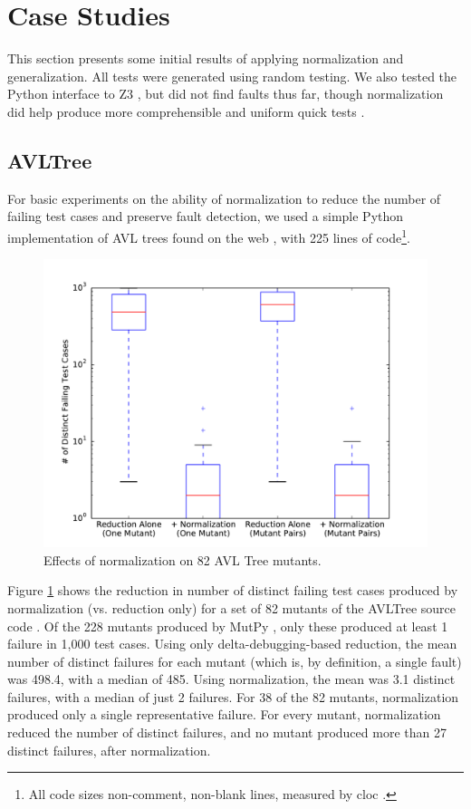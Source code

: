 \section {Case Studies}

This section presents some initial results of applying normalization
and generalization.   All tests were generated using
random testing.  We also tested the Python interface to Z3 \cite{z3},
but did not find faults thus far, though normalization did help produce more
comprehensible and uniform
quick tests \cite{icst2014}.

\subsection{AVLTree}

For basic experiments on the ability of normalization to reduce the
number of failing test cases and preserve fault detection, we used a
simple Python implementation of AVL trees found on the web
\cite{avltree}, with 225 lines of code\footnote{All code sizes non-comment, non-blank lines, measured by cloc \cite{cloc}.}.

\begin{figure}
\includegraphics[width=\columnwidth]{length}
\caption{Effects of normalization on 82 AVL Tree mutants.}
\label{normeffect}
\end{figure}

Figure \ref{normeffect} shows the reduction in number of distinct
failing test cases produced by normalization (vs. reduction only) for
a set of 82 mutants \cite{mutant} of the AVLTree source code \cite{Hunter:2007}.  Of the 228 mutants
produced by MutPy \cite{mutpy}, only these produced at least 1 failure
in 1,000 test cases.  Using only delta-debugging-based reduction, the
mean number of distinct failures for each mutant (which is, by definition,
a single fault) was 498.4, with a median of 485.  Using normalization,
the mean was 3.1 distinct failures, with a median of just 2 failures.
For 38 of the 82 mutants, normalization produced only a single
representative failure.  For every mutant, normalization reduced the
number of distinct failures, and no mutant produced more than 27
distinct failures, after normalization.

